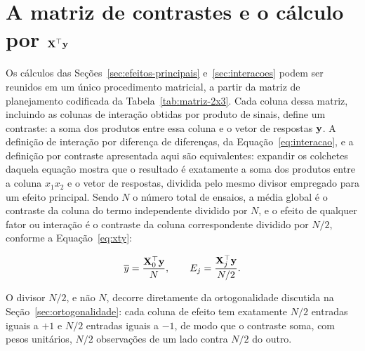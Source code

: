 \documentclass{doeapostila}
\begin{document}
\section{A matriz de contrastes e o cálculo por $\mathbf{X}^{\top}\mathbf{y}$}
\label{sec:contrastes}

Os cálculos das Seções~\ref{sec:efeitos-principais} e~\ref{sec:interacoes}
podem ser reunidos em um único procedimento matricial, a partir da matriz de
planejamento codificada da Tabela~\ref{tab:matriz-2x3}. Cada coluna dessa
matriz, incluindo as colunas de interação obtidas por produto de sinais,
define um contraste: a soma dos produtos entre essa coluna e o vetor de
respostas $\mathbf{y}$. A definição de interação por diferença de diferenças, da
Equação~\eqref{eq:interacao}, e a definição por contraste apresentada aqui
são equivalentes: expandir os colchetes daquela equação mostra que o
resultado é exatamente a soma dos produtos entre a coluna $x_{1}x_{2}$ e o
vetor de respostas, dividida pelo mesmo divisor empregado para um efeito
principal. Sendo $N$ o número total de ensaios, a média global é o
contraste da coluna do termo independente dividido por $N$, e o efeito de
qualquer fator ou interação é o contraste da coluna correspondente dividido
por $N/2$, conforme a Equação~\eqref{eq:xty}:

\begin{equation}
  \overline{y} = \frac{\mathbf{X}_{0}^{\top}\mathbf{y}}{N}, \qquad
  E_{j} = \frac{\mathbf{X}_{j}^{\top}\mathbf{y}}{N/2} .
  \label{eq:xty}
\end{equation}

O divisor $N/2$, e não $N$, decorre diretamente da ortogonalidade discutida
na Seção~\ref{sec:ortogonalidade}: cada coluna de efeito tem exatamente
$N/2$ entradas iguais a $+1$ e $N/2$ entradas iguais a $-1$, de modo que o
contraste soma, com pesos unitários, $N/2$ observações de um lado contra
$N/2$ do outro.
\end{document}
